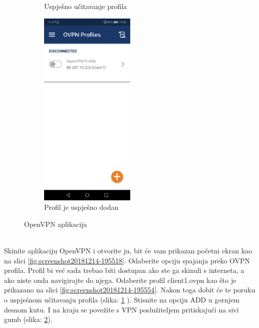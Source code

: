 \begin{figure}[!ht]
\begin{subfigure}{0.49\textwidth}
		\caption{Uspješno učitavanje profila}
		\label{fig:screenshot20181214-195602}
	\end{subfigure}
	\begin{subfigure}{0.49\textwidth}
		\centering
		\includegraphics[width = 0.5\textwidth]{slike/OpenVPN/Screenshot_20181214-195614}
		\caption{Profil je uspješno dodan}
		\label{fig:screenshot20181214-195614}
	\end{subfigure}
	\caption{OpenVPN aplikacija}
	\label{fig:combined}
\end{figure}
\\Skinite aplikaciju OpenVPN i otvorite ju, bit će vam prikazan početni ekran kao na slici \ref{fig:screenshot20181214-195518}. Odaberite opciju spajanja preko OVPN profila. Profil bi već sada trebao biti dostupan ako ste ga skinuli s interneta, a ako niste onda navigirajte do njega. Odaberite profil client1.ovpn kao što je prikazano na slici \ref{fig:screenshot20181214-195554}.
Nakon toga dobit će te poruku o uspješnom učitavanju profila (slika: \ref{fig:screenshot20181214-195602} ). Stisnite na opciju ADD u gornjem desnom kutu. I na kraju se povežite s VPN poslužiteljem pritiskajući na sivi gumb (slika: \ref{fig:screenshot20181214-195614}). 


